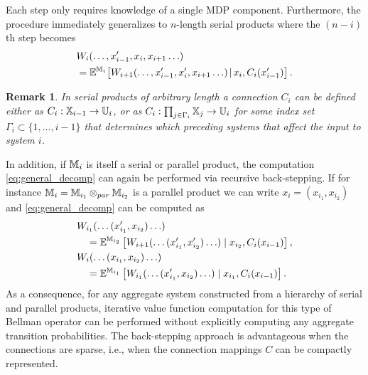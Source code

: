 \documentclass[conference]{IEEEtran}
\newtheorem{remark}{Remark}
\begin{document}
Each step only requires knowledge of a single MDP component. Furthermore, the procedure immediately generalizes to $n$-length serial products where the $(n-i)$th step becomes
\begin{equation}
\label{eq:general_decomp}
\begin{aligned}
	& W_i (\ldots, x_{i-1}', x_i, x_{i+1} \ldots) \\
	& = \mathbb{E}^{\MDP_i}\hspace{-0.5mm}  \left[ W_{i+1} (\ldots, x_{i-1}', x_i', x_{i+1} \ldots) \hspace{-0.5mm} \mid\hspace{-0.5mm}  x_i, C_i(x_{i-1}') \right].
\end{aligned}
\end{equation}
\begin{remark}
  In serial products of arbitrary length a connection $C_i$ can be defined either as $C_i: \mathbb{X}_{i-1} \rightarrow \mathbb{U}_i$, or as $C_i: \prod_{j \in \Gamma_i} \mathbb{X}_j \rightarrow \mathbb{U}_i$ for some index set $\Gamma_i \subset \{ 1, \ldots, i-1 \}$ that determines which preceding systems that affect the input to system $i$.
\end{remark}
In addition, if $\mathbb{M}_{i}$ is itself a serial or parallel product, the computation \eqref{eq:general_decomp} can again be performed via recursive back-stepping. If for instance $\mathbb{M}_{i} = \mathbb{M}_{i_1} \otimes_{par} \mathbb{M}_{i_2}$ is a parallel product we can write $x_i = (x_{i_1}, x_{i_2})$ and \eqref{eq:general_decomp} can be computed as
\begin{equation}
\begin{aligned}
	& W_{i_1}(\ldots (x_{i_1}', x_{i_2}) \ldots) \\
	& \quad = \mathbb{E}^{\mathbb{M}_{i_2}} \left[ W_{i+1}(\ldots (x_{i_1}', x_{i_2}') \ldots) \mid x_{i_2}, C_i(x_{i-1}) \right], \\
	& W_{i}(\ldots (x_{i_1}, x_{i_2}) \ldots) \\
	& \quad = \mathbb{E}^{\mathbb{M}_{i_1}} \left[ W_{i_1}(\ldots (x_{i_1}', x_{i_2}) \ldots) \mid x_{i_1}, C_i(x_{i-1}) \right].
\end{aligned}
\end{equation}
As a consequence, for any aggregate system constructed from a hierarchy of serial and parallel products, iterative value function computation for this type of Bellman operator can be performed without explicitly computing any aggregate transition probabilities. The back-stepping approach is advantageous when the connections are sparse, i.e., when the connection mappings $C$ can be compactly represented.
\end{document}
